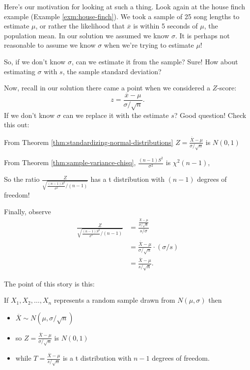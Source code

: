 \documentclass[
]{book}
\providecommand{\tightlist}{%
  \setlength{\itemsep}{0pt}\setlength{\parskip}{0pt}}
\theoremstyle{definition}
\theoremstyle{definition}
\theoremstyle{definition}
\theoremstyle{definition}
\theoremstyle{remark}
\begin{document}
Here's our motivation for looking at such a thing. Look again at the house finch example (Example \ref{exm:house-finch}). We took a sample of 25 song lengths to estimate \(\mu\), or rather the likelihood that \(\overline{x}\) is within 5 seconds of \(\mu\), the population mean. In our solution we assumed we know \(\sigma\). It is perhaps not reasonable to assume we know \(\sigma\) when we're trying to estimate \(\mu\)!

So, if we don't know \(\sigma\), can we estimate it from the sample? Sure! How about estimating \(\sigma\) with \(s\), the sample standard deviation?

Now, recall in our solution there came a point when we considered a \(Z\)-score:
\[z = \frac{\overline{x}-\mu}{\sigma/\sqrt{n}}.\]
If we don't know \(\sigma\) can we replace it with the estimate \(s\)?
Good question! Check this out:

From Theorem \ref{thm:standardizing-normal-distributions} \(\displaystyle Z =\frac{ \overline{X}-\mu}{\sigma/\sqrt{n}}\) is \(N(0,1)\)

From Theorem \ref{thm:sample-variance-chisq}, \(\displaystyle\frac{(n-1)S^2}{\sigma^2}\) is \(\chi^2(n-1)\),

So the ratio \(\displaystyle\frac{Z}{\sqrt{\frac{(n-1)S^2}{\sigma^2}\big/(n-1)}}\) has a t distribution with \((n-1)\) degrees of freedom!

Finally, observe
\begin{align*}
  \frac{Z}{\sqrt{\frac{(n-1)S^2}{\sigma^2}\big/(n-1)}} &= \frac{\frac{\overline{X}-\mu}{\sigma/\sqrt{n}}}{s/\sigma} \\
  &= \frac{\overline{X}-\mu}{\sigma/\sqrt{n}} \cdot (\sigma/s) \\
  &= \frac{\overline{X}-\mu}{s/\sqrt{n}}.
\end{align*}

The point of this story is this:

If \(X_1,X_2,\ldots, X_n\) represents a random sample drawn from \(N(\mu,\sigma)\) then

\begin{itemize}
\tightlist
\item
  \(\displaystyle \overline{X} \sim N(\mu,\sigma/\sqrt{n})\)
\item
  so \(\displaystyle Z = \frac{\overline{X}-\mu}{\sigma/\sqrt{n}}\) is \(N(0,1)\)
\item
  while \(\displaystyle T = \frac{\overline{X}-\mu}{s/\sqrt{n}}\) is a t distribution with \(n-1\) degrees of freedom.
\end{itemize}
\end{document}
